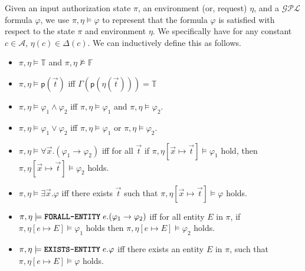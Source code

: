 \documentclass{sig-alternate}
\newcommand{\state}{\ensuremath{\pi}\xspace}
\newcommand{\planguage}{\ensuremath{\mathbf{\mathcal{GPL}}}\xspace}
\newcommand{\cA}{\ensuremath{\mathcal{A}}\xspace}
\newcommand{\funcname}[1]{\textbf{\texttt{#1}}}
\newcommand{\dom}{\ensuremath{\Delta}\xspace} %
\newcommand{\policy}{\ensuremath{\varphi}\xspace}
\newcommand{\true}{\ensuremath{\mathbb{T}}\xspace}
\newcommand{\false}{\ensuremath{\mathbb{F}}\xspace}
\newcommand{\pred}[1]{\ensuremath{\mathsf{#1}}\xspace}
\newcommand{\foralle}{\ensuremath{\funcname{FORALL-ENTITY}}\xspace}
\newcommand{\existse}{\ensuremath{\funcname{EXISTS-ENTITY}}\xspace}
\begin{document}
Given an input authorization state \state, an environment (or, request) $\eta$, and 
a \planguage formula \policy, we use $\state, \eta\models\policy$ to represent that 
the formula \policy is satisfied with respect to the state \state and environment $\eta$. 
We specifically have for any constant $c\in \cA$, $\eta(c)\in \dom(c)$.  
We can inductively define this as follows.\vspace*{-0.1in}
\begin{itemize}\setlength{\itemsep}{0em}
 \item $\state, \eta\models\true$ and $\state,\eta\not\models\false$ 
 \item $\state, \eta\models\pred{p}(\vec{t})$ iff $\Gamma(\pred{p}(\eta(\vec{t}))) = \true$ 
 \item $\state, \eta\models\policy_1\wedge \policy_2$ iff $\state, \eta\models\policy_1$ and $\state, \eta\models\policy_2$. 
 \item $\state, \eta\models\policy_1\vee\policy_2$ iff $\state, \eta\models\policy_1$ or $\state, \eta\models\policy_2$. 
 \item $\state, \eta\models\forall\vec{x}.(\policy_1\rightarrow\policy_2)$ iff for all $\vec{t}$  if 
 $\state, \eta[\vec{x}\mapsto\vec{t}]\models\policy_1$ hold, then $\state, \eta[\vec{x}\mapsto\vec{t}]\models\policy_2$ holds. 
 \item $\state, \eta\models\exists\vec{x}.\policy$ iff there exists $\vec{t}$ such that $\state, \eta[\vec{x}\mapsto\vec{t}]\models\policy$ holds. 
 \item $\state, \eta\models\foralle\;e.(\policy_1\rightarrow\policy_2)$ iff for all entity $E$ in \state, if $\state, \eta[e\mapsto E]\models\policy_1$ holds 
 then $\state, \eta[e\mapsto E]\models\policy_2$ holds. 
 \item $\state, \eta\models\existse\;e.\policy$ iff there exists an entity $E$ in \state, such that $\state, \eta[e\mapsto E]\models\policy$ holds. 
 \end{itemize}
\end{document}
